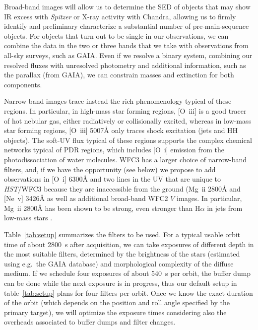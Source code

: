 \documentclass[12pt]{article}
\begin{document}
Broad-band images will allow us to determine the SED of objects that may show IR excess with \emph{Spitzer} or X-ray activity with Chandra, allowing us to firmly identify and preliminary characterize a substantial number of pre-main-sequence objects. For objects that turn out to be single in our observations, we can combine the data in the two or three bands that we take with observations from all-sky surveys, such as GAIA. Even if we resolve a binary system, combining our resolved fluxes with unresolved photometry and additional information, such as the parallax (from GAIA), we can constrain masses and extinction for both components.

Narrow band images trace instead the rich phenomenology typical of these regions. In particular, in 
high-mass star forming regions, [O~{\sc iii}] is a good tracer of hot nebular gas, either radiatively or collisionally excited, whereas in low-mass star forming regions, [O~{\sc iii}] 5007\AA{} only traces shock excitation (jets and HH objects). The soft-UV flux typical of these regions supports the complex chemical networks typical of PDR regions, which includes [O~{\sc i}] emission from the photodissociation of water molecules. WFC3 has a larger choice of narrow-band filters, and, if we have the opportunity (see below) we propose to add observations in [O~{\sc i}] 6300\AA{} and two lines in the UV that are unique to \emph{HST}/WFC3 because they are inaccessible from the ground (Mg~{\sc ii} 2800\AA{} and [Ne~{\sc v}] 3426\AA{} as well as additional broad-band WFC2 $V$ images. In particular, Mg~{\sc ii} 2800\AA{} has been shown to be strong, even stronger than H$\alpha$ in jets from low-mass stars \citep{2007ApJ...663..350C}.

 Table~\ref{tab:setup} summarizes the filters to be used.
For a typical usable orbit time of about 2800~s after acquisition, we can take exposures of different depth in the most suitable filters, determined by the brightness of the stars (estimated using e.g.\ the GAIA database) and morphological complexity of the diffuse medium. If we schedule four exposures of about 540~s per orbit, the buffer dump can be done while the next exposure is in progress, thus our default setup in table~\ref{tab:setup} plans for four filters per orbit. 
Once we know the exact duration of the orbit (which depends on the position and roll angle specified by the primary target), we will optimize the exposure times considering also the overheads associated to buffer dumps and filter changes.
\end{document}

